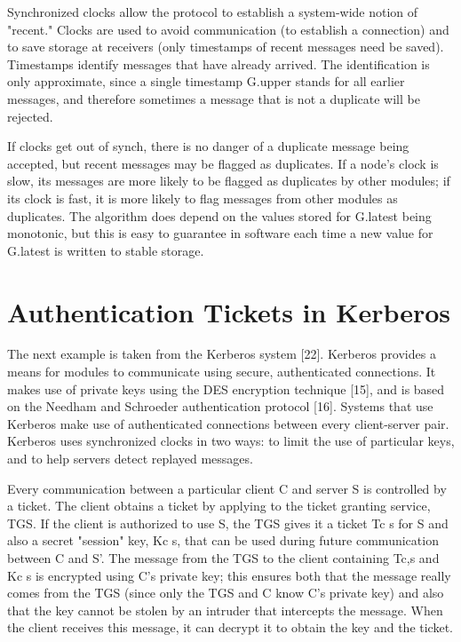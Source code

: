 \documentclass[a4paper,11pt,notitlepage,twoside,openright]{article}
\begin{document}
Synchronized clocks allow the protocol to establish a system-wide notion
of "recent." Clocks are used to avoid communication (to establish a
connection) and to save storage at receivers (only timestamps of recent
messages need be saved). Timestamps identify messages that have already
arrived. The identification is only approximate, since a single
timestamp G.upper stands for all earlier messages, and therefore
sometimes a message that is not a duplicate will be rejected.

If clocks get out of synch, there is no danger of a duplicate message
being accepted, but recent messages may be flagged as duplicates. If a
node's clock is slow, its messages are more likely to be flagged as
duplicates by other modules; if its clock is fast, it is more likely to
flag messages from other modules as duplicates. The algorithm does
depend on the values stored for G.latest being monotonic, but this is
easy to guarantee in software each time a new value for G.latest is
written to stable storage.


\hypertarget{authentication-tickets-in-kerberos}{%
\section{Authentication Tickets in
Kerberos}\label{authentication-tickets-in-kerberos}}


The next example is taken from the Kerberos system {[}22{]}. Kerberos
provides a means for modules to communicate using secure, authenticated
connections. It makes use of private keys using the DES encryption
technique {[}15{]}, and is based on the Needham and Schroeder
authentication protocol {[}16{]}. Systems that use Kerberos make use of
authenticated connections between every client-server pair. Kerberos
uses synchronized clocks in two ways: to limit the use of particular
keys, and to help servers detect replayed messages.

Every communication between a particular client C and server S is
controlled by a ticket. The client obtains a ticket by applying to the
ticket granting service, TGS. If the client is authorized to use S, the
TGS gives it a ticket Tc s for S and also a secret "session" key, Kc s,
that can be used during future communication between C and S'. The
message from the TGS to the client containing Tc,s and Kc s is encrypted
using C's private key; this ensures both that the message really comes
from the TGS (since only the TGS and C know C's private key) and also
that the key cannot be stolen by an intruder that intercepts the
message. When the client receives this message, it can decrypt it to
obtain the key and the ticket.
\end{document}
